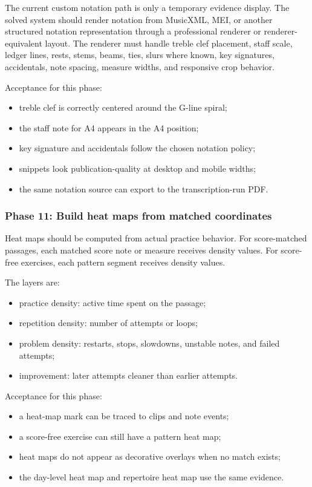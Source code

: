 The current custom notation path is only a temporary evidence display. The solved system should render notation from MusicXML, MEI, or another structured notation representation through a professional renderer or renderer-equivalent layout. The renderer must handle treble clef placement, staff scale, ledger lines, rests, stems, beams, ties, slurs where known, key signatures, accidentals, note spacing, measure widths, and responsive crop behavior.

Acceptance for this phase:
\begin{itemize}
    \item treble clef is correctly centered around the G-line spiral;
    \item the staff note for A4 appears in the A4 position;
    \item key signature and accidentals follow the chosen notation policy;
    \item snippets look publication-quality at desktop and mobile widths;
    \item the same notation source can export to the transcription-run PDF.
\end{itemize}

\subsubsection*{Phase 11: Build heat maps from matched coordinates}

Heat maps should be computed from actual practice behavior. For score-matched passages, each matched score note or measure receives density values. For score-free exercises, each pattern segment receives density values.

The layers are:
\begin{itemize}
    \item practice density: active time spent on the passage;
    \item repetition density: number of attempts or loops;
    \item problem density: restarts, stops, slowdowns, unstable notes, and failed attempts;
    \item improvement: later attempts cleaner than earlier attempts.
\end{itemize}

Acceptance for this phase:
\begin{itemize}
    \item a heat-map mark can be traced to clips and note events;
    \item a score-free exercise can still have a pattern heat map;
    \item heat maps do not appear as decorative overlays when no match exists;
    \item the day-level heat map and repertoire heat map use the same evidence.
\end{itemize}

